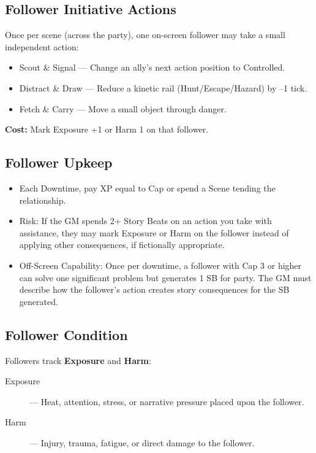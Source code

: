 \subsection*{Follower Initiative Actions}

Once per scene (across the party), one on-screen follower may take a small independent action:

\begin{itemize}
    \item Scout \& Signal --- Change an ally's next action position to Controlled.
    \item Distract \& Draw --- Reduce a kinetic rail (Hunt/Escape/Hazard) by –1 tick.
    \item Fetch \& Carry --- Move a small object through danger.
\end{itemize}

\textbf{Cost:} Mark Exposure +1 or Harm 1 on that follower.

\subsection*{Follower Upkeep}

\begin{itemize}
    \item Each Downtime, pay XP equal to Cap or spend a Scene tending the relationship.
    \item Risk: If the GM spends 2+ Story Beats on an action you take with assistance, they may mark Exposure or Harm on the follower instead of applying other consequences, if fictionally appropriate.
    \item Off-Screen Capability: Once per downtime, a follower with Cap 3 or higher can solve one significant problem but generates 1 SB for party. The GM must describe how the follower's action creates story consequences for the SB generated.
\end{itemize}

\subsection*{Follower Condition}

Followers track \textbf{Exposure} and \textbf{Harm}:

\begin{description}
    \item[Exposure] --- Heat, attention, stress, or narrative pressure placed upon the follower.
    \item[Harm] --- Injury, trauma, fatigue, or direct damage to the follower.
\end{description}

